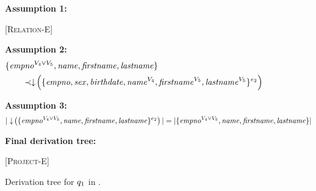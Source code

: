 \begin{figure}
\caption[Example of derivation tree to determine the type of a query]{Derivation tree for \ensuremath{\vQ_1} in .}

\scriptsize

\textbf{Assumption 1:}
\begin{prooftree*}
 [\textsc{Relation-E}] {\env [\dimMeta_2] [\vSch_2] {\empbio} {\annot [\dimMeta_2] {(\empno, \sex, \birthdate, \annot [\vFour] \name, \annot [\vFive] \fname, \annot [\vFive] \lname)}}}
\end{prooftree*}

\medskip
\textbf{Assumption 2:}
\begin{alignat*}{1}
&  { \{\annot [\vFour \vee \vFive] \empno, \name, \fname, \lname  \} }\\ 
&\qquad \prec
\pushIn{\{ \empno, \sex,  \birthdate, \annot [\vFour] \name, \annot [\vFive] \fname, \annot [\vFive] \lname\}^{\dimMeta_2} } 
\end{alignat*}

\medskip
\textbf{Assumption 3:}
\begin{alignat*}{1}
|\pushIn { \{\annot [\vFour \vee \vFive] \empno, \name, \fname, \lname  \}^{\dimMeta_2} }|
= |{ \{\annot [\vFour \vee \vFive] \empno, \name, \fname, \lname  \} }|
\end{alignat*}

\medskip
\textbf{Final derivation tree:}
\begin{prooftree*}
 [\textsc{Project-E}] { {\annot [\dimMeta_2] {( \annot [(\vFour \vee \vFive) ] \empno, \annot [\vFour] \name, \annot [\vFive] \fname, \annot [\vFive] \lname)} }}
\end{prooftree*}
\end{figure}

